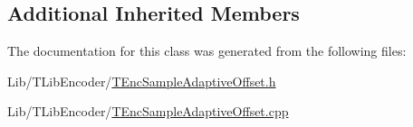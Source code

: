 \subsection*{Additional Inherited Members}


The documentation for this class was generated from the following files\+:\begin{DoxyCompactItemize}
\item 
Lib/\+T\+Lib\+Encoder/\hyperlink{_t_enc_sample_adaptive_offset_8h}{T\+Enc\+Sample\+Adaptive\+Offset.\+h}\item 
Lib/\+T\+Lib\+Encoder/\hyperlink{_t_enc_sample_adaptive_offset_8cpp}{T\+Enc\+Sample\+Adaptive\+Offset.\+cpp}\end{DoxyCompactItemize}
